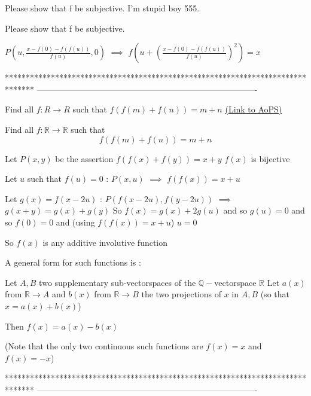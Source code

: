 \begin{solution}
	Please show that f be subjective.
I'm stupid boy 555.
\end{solution}



\begin{solution}
	\begin{tcolorbox}Please show that f be subjective.\end{tcolorbox}
$P(u,\frac{x-f(0)-f(f(u))}{f(u)},0)$ $\implies$ $f\left(u+\left(\frac{x-f(0)-f(f(u))}{f(u)}\right)^2\right)=x$
\end{solution}
*******************************************************************************
-------------------------------------------------------------------------------

\begin{problem}
	Find all $f:R \rightarrow R$ such that
$f(f(m)+f(n))=m+n$
	\flushright \href{https://artofproblemsolving.com/community/c6h581790}{(Link to AoPS)}
\end{problem}



\begin{solution}
	\begin{tcolorbox}Find all $f:\mathbb R \to \mathbb R$ such that
\[f(f(m)+f(n))=m+n\]\end{tcolorbox}
Let $P(x,y)$ be the assertion $f(f(x)+f(y))=x+y$
$f(x)$ is bijective

Let $u$ such that $f(u)=0$ : $P(x,u)$ $\implies$ $f(f(x))=x+u$

Let $g(x)=f(x-2u)$ : $P(f(x-2u),f(y-2u))$ $\implies$ $g(x+y)=g(x)+g(y)$
So $f(x)=g(x)+2g(u)$ and so $g(u)=0$ and so $f(0)=0$ and (using $f(f(x))=x+u$) $u=0$

So $f(x)$ is any additive involutive function 

A general form for such functions is :

Let $A,B$ two supplementary sub-vectorspaces of the $\mathbb Q-$vectorspace $\mathbb R$
Let $a(x)$ from $\mathbb R\to A$ and $b(x)$ from $\mathbb R\to B$ the two projections of $x$ in $A,B$ (so that $x=a(x)+b(x)$)

Then $f(x)=a(x)-b(x)$

(Note that the only two continuous such functions are $f(x)=x$ and $f(x)=-x$)
\end{solution}
*******************************************************************************
-------------------------------------------------------------------------------

